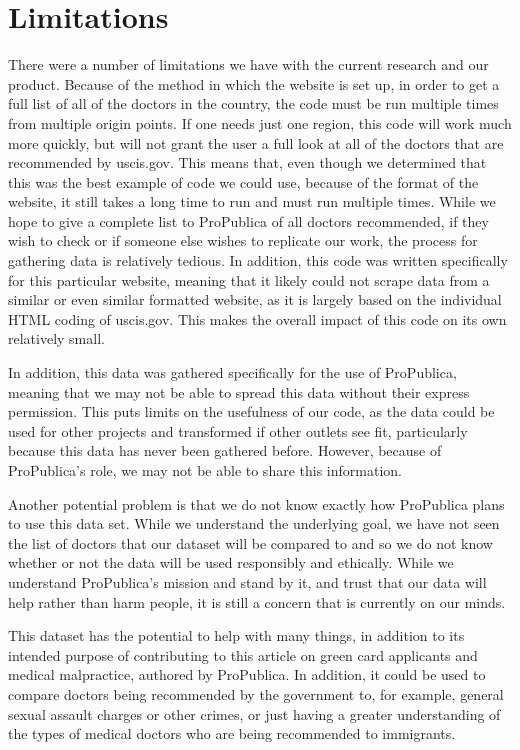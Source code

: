 \documentclass[10pt,letterpaper]{article}
\begin{document}
\section{Limitations}\label{limitations}

There were a number of limitations we have with the current research and
our product. Because of the method in which the website is set up, in
order to get a full list of all of the doctors in the country, the code
must be run multiple times from multiple origin points. If one needs
just one region, this code will work much more quickly, but will not
grant the user a full look at all of the doctors that are recommended by
uscis.gov. This means that, even though we determined that this was the
best example of code we could use, because of the format of the website,
it still takes a long time to run and must run multiple times. While we
hope to give a complete list to ProPublica of all doctors recommended,
if they wish to check or if someone else wishes to replicate our work,
the process for gathering data is relatively tedious. In addition, this
code was written specifically for this particular website, meaning that
it likely could not scrape data from a similar or even similar formatted
website, as it is largely based on the individual HTML coding of
uscis.gov. This makes the overall impact of this code on its own
relatively small.

In addition, this data was gathered specifically for the use of
ProPublica, meaning that we may not be able to spread this data without
their express permission. This puts limits on the usefulness of our
code, as the data could be used for other projects and transformed if
other outlets see fit, particularly because this data has never been
gathered before. However, because of ProPublica's role, we may not be
able to share this information.

Another potential problem is that we do not know exactly how ProPublica
plans to use this data set. While we understand the underlying goal, we
have not seen the list of doctors that our dataset will be compared to
and so we do not know whether or not the data will be used responsibly
and ethically. While we understand ProPublica's mission and stand by it,
and trust that our data will help rather than harm people, it is still a
concern that is currently on our minds.

This dataset has the potential to help with many things, in addition to
its intended purpose of contributing to this article on green card
applicants and medical malpractice, authored by ProPublica. In addition,
it could be used to compare doctors being recommended by the government
to, for example, general sexual assault charges or other crimes, or just
having a greater understanding of the types of medical doctors who are
being recommended to immigrants.
\end{document}
